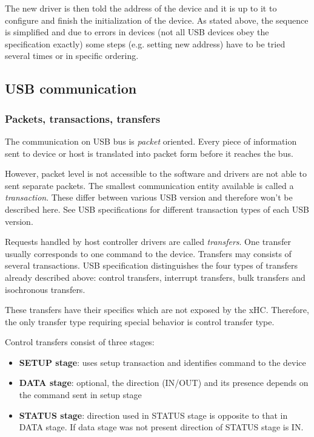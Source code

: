 The new driver is then told the address of the device and it is up to it to
configure and finish the initialization of the device.
As stated above, the sequence is simplified and due to errors in devices (not
all USB devices obey the specification exactly) some steps (e.g. setting new
address) have to be tried several times or in specific ordering.

\subsection{USB communication}

\subsubsection{Packets, transactions, transfers}

The communication on USB bus is \textit{packet} oriented. Every piece of
information sent to device or host is translated into packet form before it
reaches the bus.

However, packet level is not accessible to the software and drivers are not
able to sent separate packets. The smallest communication entity available is
called a \textit{transaction}. These differ between various USB version and
therefore won't be described here. See USB specifications for different
transaction types of each USB version.

Requests handled by host controller drivers are called \textit{transfers}. One
transfer usually corresponds to one command to the device. Transfers may
consists of several transactions. USB specification distinguishes the four
types of transfers already described above: control transfers, interrupt
transfers, bulk transfers and isochronous transfers.

These transfers have their specifics which are not exposed by the xHC.
Therefore, the only transfer type requiring special behavior is control
transfer type.

Control transfers consist of three stages:
\begin{itemize}
\item \textbf{SETUP stage}: uses setup transaction and identifies command to
the device
\item \textbf{DATA stage}: optional, the direction (IN/OUT) and its presence
depends on the command sent in setup stage
\item \textbf{STATUS stage}: direction used in STATUS stage is opposite to that
in DATA stage. If data stage was not present direction of STATUS stage is IN.
\end{itemize}

